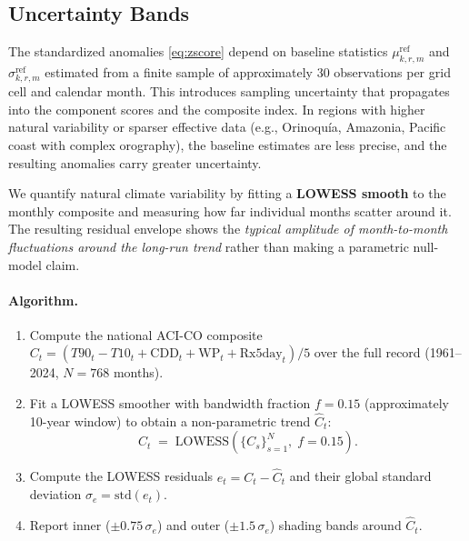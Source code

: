 \documentclass[12pt]{article}
\begin{document}
\subsection{Uncertainty Bands}\label{sec:uncertainty}
 
The standardized anomalies \eqref{eq:zscore} depend on baseline statistics $\mu^{\mathrm{ref}}_{k,r,m}$ and $\sigma^{\mathrm{ref}}_{k,r,m}$ estimated from a finite sample of approximately 30 observations per grid cell and calendar month. This introduces sampling uncertainty that propagates into the component scores and the composite index. In regions with higher natural variability or sparser effective data (e.g., Orinoquía, Amazonia, Pacific coast with complex orography), the baseline estimates are less precise, and the resulting anomalies carry greater uncertainty.
 
We quantify natural climate variability by fitting a \textbf{LOWESS smooth} to the monthly composite and measuring how far individual months scatter around it. The resulting residual envelope shows the \emph{typical amplitude of month-to-month fluctuations around the long-run trend} rather than making a parametric null-model claim.

\paragraph{Algorithm.}
\begin{enumerate}
\item Compute the national ACI-CO composite $C_t = (T90_t - T10_t + \mathrm{CDD}_t + \mathrm{WP}_t + \mathrm{Rx5day}_t)/5$ over the full record (1961--2024, $N=768$ months).
\item Fit a LOWESS smoother with bandwidth fraction $f = 0.15$ (approximately 10-year window) to obtain a non-parametric trend $\hat{C}_t$:
\begin{equation}
\hat{C}_t \;=\; \mathrm{LOWESS}\!\left(\{C_s\}_{s=1}^{N},\; f=0.15\right).
\end{equation}
\item Compute the LOWESS residuals $e_t = C_t - \hat{C}_t$ and their global standard deviation $\sigma_e = \mathrm{std}(e_t)$.
\item Report inner ($\pm 0.75\,\sigma_e$) and outer ($\pm 1.5\,\sigma_e$) shading bands around $\hat{C}_t$.
\end{enumerate}
\end{document}
